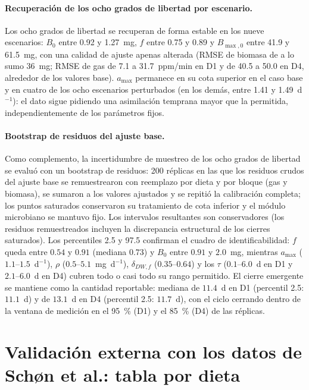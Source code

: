 \documentclass[11pt,a4paper]{article}
\begin{document}
\paragraph{Recuperación de los ocho grados de libertad por escenario.}
Los ocho grados de libertad se recuperan de forma estable en los nueve escenarios: $B_0$ entre 0.92 y 1.27~mg, $f$ entre 0.75 y 0.89 y $B_{\max,0}$ entre 41.9 y 61.5~mg, con una calidad de ajuste apenas alterada (RMSE de biomasa de a lo sumo 36~mg; RMSE de gas de 7.1 a 31.7~ppm/min en D1 y de 40.5 a 50.0 en D4, alrededor de los valores base). $a_{\max}$ permanece en su cota superior en el caso base y en cuatro de los ocho escenarios perturbados (en los demás, entre 1.41 y 1.49~d$^{-1}$): el dato sigue pidiendo una asimilación temprana mayor que la permitida, independientemente de los parámetros fijos.

\paragraph{Bootstrap de residuos del ajuste base.}
Como complemento, la incertidumbre de muestreo de los ocho grados de libertad se evaluó con un bootstrap de residuos: 200 réplicas en las que los residuos crudos del ajuste base se remuestrearon con reemplazo por dieta y por bloque (gas y biomasa), se sumaron a los valores ajustados y se repitió la calibración completa; los puntos saturados conservaron su tratamiento de cota inferior y el módulo microbiano se mantuvo fijo. Los intervalos resultantes son conservadores (los residuos remuestreados incluyen la discrepancia estructural de los cierres saturados). Los percentiles 2.5 y 97.5 confirman el cuadro de identificabilidad: $f$ queda entre $0.54$ y $0.91$ (mediana $0.73$) y $B_0$ entre $0.91$ y $2.0$~mg, mientras $a_{\max}$ ($1.1$--$1.5$~d$^{-1}$), $\rho$ ($0.5$--$5.1$~mg~d$^{-1}$), $\delta_{DW,f}$ ($0.35$--$0.64$) y los $\tau$ ($0.1$--$6.0$~d en D1 y $2.1$--$6.0$~d en D4) cubren todo o casi todo su rango permitido. El cierre emergente se mantiene como la cantidad reportable: mediana de $11.4$~d en D1 (percentil 2.5: $11.1$~d) y de $13.1$~d en D4 (percentil 2.5: $11.7$~d), con el ciclo cerrando dentro de la ventana de medición en el 95~\% (D1) y el 85~\% (D4) de las réplicas.

\section{Validación externa con los datos de Schøn et al.: tabla por dieta}
\label{sec:schntab}
\end{document}
